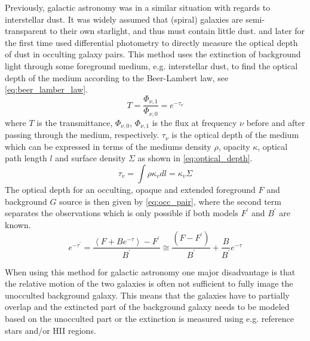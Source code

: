 \documentclass{aa}
\begin{document}
Previously, galactic astronomy was in a similar situation with regards to interstellar dust. It was widely assumed that (spiral) galaxies are semi-transparent to their own starlight, and thus must contain little dust. \cite{white1992direct} and later \cite{james1993measurement} for the first time used differential photometry to directly measure the optical depth of dust in occulting galaxy pairs. This method uses the extinction of background light through some foreground medium, e.g. interstellar dust, to find the optical depth of the medium according to the Beer-Lambert law, see \autoref{eq:beer_lamber_law}.
\begin{equation}
\label{eq:beer_lamber_law}
    T=\frac{\Phi_{\nu,1}}{\Phi_{\nu,0}}=e^{-\tau_{\nu}}
\end{equation}
where $T$ is the transmittance, $\Phi_{\nu,0}$, $\Phi_{\nu,1}$ is the flux at frequency $\nu$ before and after passing through the medium, respectively. $\tau_{\nu}$ is the optical depth of the medium which can be expressed in terms of the mediums density $\rho$, opacity $\kappa$, optical path length $l$ and surface density $\Sigma$ as shown in \autoref{eq:optical_depth}.
\begin{equation}
\label{eq:optical_depth}
    \tau_{v}=\int \rho \kappa_{v} d l=\kappa_{v} \Sigma
\end{equation}
The optical depth for an occulting, opaque and extended foreground $F$ and background $G$ source is then given by \autoref{eq:occ_pair}, where the second term separates the observations which is only possible if both models $F^{\prime}$ and $B^{\prime}$ are known. \citep{white2000seeing}
\begin{equation}
\label{eq:occ_pair}
    e^{-\tau^{\prime}}=\frac{\left\langle F+B e^{-\tau}\right\rangle-F^{\prime}}{B^{\prime}} \cong \frac{\left(F-F^{\prime}\right)}{B^{\prime}}+\frac{B}{B^{\prime}} e^{-\tau}
\end{equation}

When using this method for galactic astronomy one major disadvantage is that the relative motion of the two galaxies is often not sufficient to fully image the unocculted background galaxy. This means that the galaxies have to partially overlap and the extincted part of the background galaxy needs to be modeled based on the unocculted part or the extinction is measured using e.g. reference stars and/or HII regions.
\end{document}
